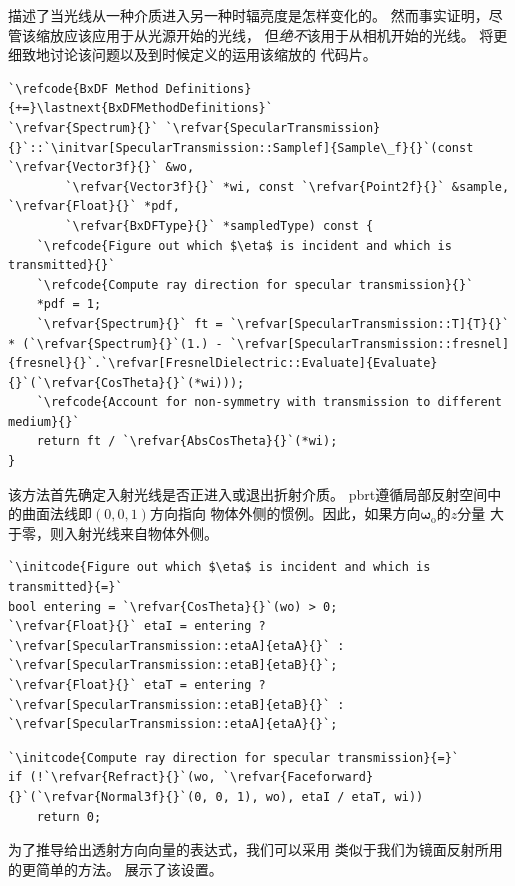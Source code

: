 描述了当光线从一种介质进入另一种时辐亮度是怎样变化的。
然而事实证明，尽管该缩放应该应用于从光源开始的光线，
但\emph{绝不}该用于从相机开始的光线。
将更细致地讨论该问题以及到时候定义的运用该缩放的
代码片{}。
\begin{lstlisting}
`\refcode{BxDF Method Definitions}{+=}\lastnext{BxDFMethodDefinitions}`
`\refvar{Spectrum}{}` `\refvar{SpecularTransmission}{}`::`\initvar[SpecularTransmission::Samplef]{Sample\_f}{}`(const `\refvar{Vector3f}{}` &wo,
        `\refvar{Vector3f}{}` *wi, const `\refvar{Point2f}{}` &sample, `\refvar{Float}{}` *pdf,
        `\refvar{BxDFType}{}` *sampledType) const {
    `\refcode{Figure out which $\eta$ is incident and which is transmitted}{}`
    `\refcode{Compute ray direction for specular transmission}{}`
    *pdf = 1;
    `\refvar{Spectrum}{}` ft = `\refvar[SpecularTransmission::T]{T}{}` * (`\refvar{Spectrum}{}`(1.) - `\refvar[SpecularTransmission::fresnel]{fresnel}{}`.`\refvar[FresnelDielectric::Evaluate]{Evaluate}{}`(`\refvar{CosTheta}{}`(*wi)));
    `\refcode{Account for non-symmetry with transmission to different medium}{}`
    return ft / `\refvar{AbsCosTheta}{}`(*wi);
}
\end{lstlisting}

该方法首先确定入射光线是否正进入或退出折射介质。
pbrt遵循局部反射空间中的曲面法线即$(0,0,1)$方向指向
物体外侧的惯例。因此，如果方向${\bm\omega_{\mathrm{o}}}$的$z$分量
大于零，则入射光线来自物体外侧。
\begin{lstlisting}
`\initcode{Figure out which $\eta$ is incident and which is transmitted}{=}`
bool entering = `\refvar{CosTheta}{}`(wo) > 0;
`\refvar{Float}{}` etaI = entering ? `\refvar[SpecularTransmission::etaA]{etaA}{}` : `\refvar[SpecularTransmission::etaB]{etaB}{}`;
`\refvar{Float}{}` etaT = entering ? `\refvar[SpecularTransmission::etaB]{etaB}{}` : `\refvar[SpecularTransmission::etaA]{etaA}{}`;
\end{lstlisting}
\begin{lstlisting}
`\initcode{Compute ray direction for specular transmission}{=}`
if (!`\refvar{Refract}{}`(wo, `\refvar{Faceforward}{}`(`\refvar{Normal3f}{}`(0, 0, 1), wo), etaI / etaT, wi))
    return 0;
\end{lstlisting}

为了推导给出透射方向向量的表达式，我们可以采用
类似于我们为镜面反射所用的更简单的方法。
展示了该设置。

